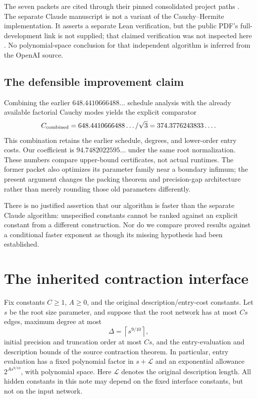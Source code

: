 \documentclass[11pt]{article}
\theoremstyle{remark}\newtheorem{remark}[theorem]{Remark}
\newcommand{\ceil}[1]{\left\lceil #1\right\rceil}
\newcommand{\LL}{\mathcal L}
\begin{document}
The seven packets are cited through their pinned consolidated project paths \cite{packets}. The separate Claude manuscript is not a variant of the Cauchy--Hermite implementation. It asserts a separate Lean verification, but the public PDF's full-development link is not supplied; that claimed verification was not inspected here \cite{claude}. No polynomial-space conclusion for that independent algorithm is inferred from the OpenAI source.

\subsection{The defensible improvement claim}
Combining the earlier \(648.4410666488\ldots\) schedule analysis with the already available factorial Cauchy modes yields the explicit comparator
\begin{equation}
 C_{\rm combined}=648.4410666488\ldots/\sqrt3
 =374.3776243833\ldots .\label{eq:comparison}
\end{equation}
This combination retains the earlier schedule, degrees, and lower-order entry costs. Our coefficient is \(94.7482022595\ldots\) under the same root normalization. These numbers compare upper-bound certificates, not actual runtimes. The former packet also optimizes its parameter family near a boundary infimum; the present argument changes the packing theorem and precision-gap architecture rather than merely rounding those old parameters differently.

There is no justified assertion that our algorithm is faster than the separate Claude algorithm: unspecified constants cannot be ranked against an explicit constant from a different construction. Nor do we compare proved results against a conditional faster exponent as though its missing hypothesis had been established.

\section{The inherited contraction interface}
\label{sec:interface}
Fix constants \(C\ge1\), \(A\ge0\), and the original description/entry-cost constants. Let \(s\) be the root size parameter, and suppose that the root network has at most \(Cs\) edges, maximum degree at most
\[
 \Delta=\ceil{s^{9/10}},
\]
initial precision and truncation order at most \(Cs\), and the entry-evaluation and description bounds of the source contraction theorem. In particular, entry evaluation has a fixed polynomial factor in \(s+\LL\) and an exponential allowance \(2^{A s^{9/10}}\), with polynomial space. Here \(\LL\) denotes the original description length. All hidden constants in this note may depend on the fixed interface constants, but not on the input network.
\end{document}
